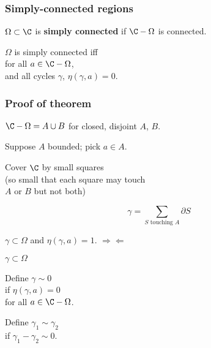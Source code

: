 \documentclass[14pt]{chalkfjord}
\begin{document}
\begin{frame}
  \frametitle{Simply-connected regions}

  $\Omega \subset \C$ is \textbf{simply connected} if $\C - \Omega$ is
  connected.

  \begin{theorem}
    $\Omega$ is simply connected iff \\
    \quad for all $a \in \C - \Omega$, \\
    \quad\quad and all cycles $\gamma$,
    \quad $\eta(\gamma,a) = 0$.
  \end{theorem}
\end{frame}

\begin{frame}
  \frametitle{Proof of theorem}

  $\C - \Omega = A \cup B$ for closed, disjoint $A$, $B$.

  \pause

  Suppose $A$ bounded; pick $a \in A$.

  \pause

  Cover $\C$ by small squares \\
  \quad (so small that each square may touch \\
  \quad $A$ or $B$ but not both)

  \pause

  $$\gamma = \sum_{\mbox{$S$ touching $A$}} \partial S$$

  \pause

  $\gamma \subset \Omega$ and $\eta(\gamma,a) = 1$.  \pause\hfill $\Rightarrow\Leftarrow$
\end{frame}

\begin{frame}
  $\gamma \subset \Omega$

  Define $\gamma \sim 0$ \\
  \quad if $\eta(\gamma,a) = 0$ \\
  \quad for all $a \in \C - \Omega$.

  \pause

  Define $\gamma_1 \sim \gamma_2$ \\  
  \quad if $\gamma_1 - \gamma_2 \sim 0$.

\end{frame}

\end{document}

